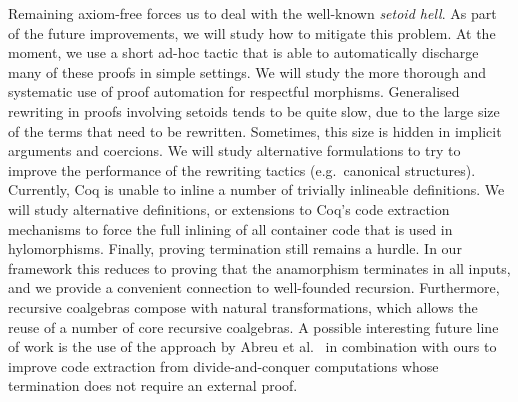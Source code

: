 \documentclass{llncs}
\begin{document}
Remaining axiom-free forces us to deal with the well-known
\emph{setoid hell}. As part of the future improvements, we will study how to
mitigate this problem. At the moment, we use a short ad-hoc tactic that is able
to automatically discharge many of these proofs in simple settings.  We will
study the more thorough and systematic use of proof automation for respectful
morphisms.  Generalised rewriting in proofs involving setoids tends to be quite
slow, due to the large size of the terms that need to be rewritten. Sometimes,
this size is hidden in implicit arguments and coercions. We will study
alternative formulations to try to improve the performance of the rewriting
tactics (e.g.\ canonical structures).  Currently, Coq is unable to inline a
number of trivially inlineable definitions.  We will study alternative
definitions, or extensions to Coq's code extraction mechanisms to force the
full inlining of all container code that is used in hylomorphisms.  Finally,
proving termination still remains a hurdle. In our framework this reduces to
proving that the anamorphism
terminates in all inputs, and we provide a convenient connection to
well-founded recursion. Furthermore, recursive coalgebras compose with natural
transformations, which allows the reuse
of a number of core recursive coalgebras. A possible interesting future line of work
is the use of the approach by Abreu et al.~\cite{AbreuDHJMS23} in combination with ours to
improve code extraction from divide-and-conquer computations whose termination
does not require an external proof. 




\end{document}
